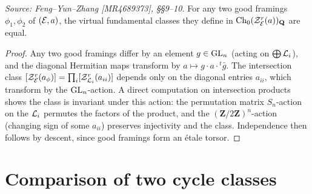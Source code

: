 \begin{lemma}
  \label{lem:framing-independence}
  \textit{Source: Feng--Yun--Zhang [MR4689373], \S\S9--10.}
  For any two good framings \(\phi_1, \phi_2\) of \((\mathcal{E}, a)\), the virtual fundamental
  classes they define in \(\operatorname{Ch}_0(\mathcal{Z}_{\mathcal{E}}^r(a))_{\mathbf{Q}}\) are equal.
\end{lemma}

\begin{proof}
  Any two good framings differ by an element \(g \in \operatorname{GL}_n\) (acting on
  \(\bigoplus \mathcal{L}_i\)), and the diagonal Hermitian maps transform by
  \(a \mapsto g \cdot a \cdot {}^t\bar{g}\). The intersection class
  \([\mathcal{Z}_{\mathcal{E}}^r(a_\phi)] = \prod_i [\mathcal{Z}_{\mathcal{L}_i}^r(a_{ii})]\) depends only on the
  diagonal entries \(a_{ii}\), which transform by the \(\operatorname{GL}_n\)-action.  A direct
  computation on intersection products shows the class is invariant under this
  action: the permutation matrix \(S_n\)-action on the \(\mathcal{L}_i\) permutes the
  factors of the product, and the \((\mathbf{Z}/2\mathbf{Z})^n\)-action (changing
  sign of some \(a_{ii}\)) preserves injectivity and the class. Independence then
  follows by descent, since good framings form an étale torsor.
\end{proof}

\section{Comparison of two cycle classes}

